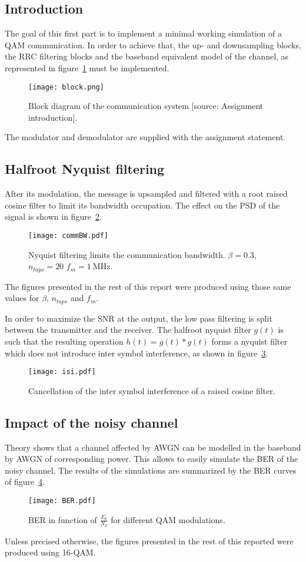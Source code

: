 \subsection{Introduction}
The goal of this first part is to implement a minimal working simulation of a QAM communication.
In order to achieve that, the up- and downsampling blocks, the RRC filtering blocks and the baseband equivalent model of the channel, as represented in figure~\ref{fig:chain} must be implemented.
\begin{figure}[htbp]
\centering
\texttt{[image: block.png]}
\caption{Block diagram of the communication system [source: Assignment introduction].\label{fig:chain}}
\end{figure}
The modulator and demodulator are supplied with the assignment statement.

\subsection{Halfroot Nyquist filtering}
After its modulation, the message is upsampled and filtered with a root raised cosine filter to limit its bandwidth occupation.
The effect on the PSD of the signal is shown in figure~\ref{fig:LPF}.
\begin{figure}[htbp]
\centering
\texttt{[image: commBW.pdf]}
\caption{Nyquist filtering limits the communication bandwidth. $\beta = 0.3$, $n_{taps} = 20$ $f_m = \SI{1}{\mega\hertz}.$ \label{fig:LPF}}
\end{figure}
The figures presented in the rest of this report were produced using those same values for $\beta$, $n_{taps}$ and $f_m$.

In order to maximize the SNR at the output, the low pass filtering is split between the transmitter and the receiver.
The halfroot nyquist filter $g(t)$ is such that the resulting operation $h(t) = g(t)*g(t)$ forms a nyquist filter which does not introduce inter symbol interference, as shown in figure~\ref{fig:noISI}.
\begin{figure}
\centering
\texttt{[image: isi.pdf]}
\caption{Cancellation of the inter symbol interference of a raised cosine filter.\label{fig:noISI}}
\end{figure}

\subsection{Impact of the noisy channel}
Theory shows that a channel affected by AWGN can be modelled in the baseband by AWGN of corresponding power.
This allows to easily simulate the BER of the noisy channel.
The results of the simulations are summarized by the BER curves of figure~\ref{fig:BER}.
\begin{figure}[htbp]
\texttt{[image: BER.pdf]}
\caption{BER in function of $\frac{E_b}{N_0}$ for different QAM modulations.\label{fig:BER}}
\end{figure}
Unless precised otherwise, the figures presented in the rest of this reported were produced using 16-QAM.

